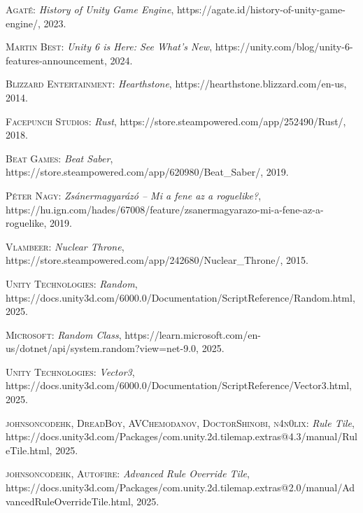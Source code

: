 \documentclass[
]{thesis-ekf}
\theoremstyle{definition}
\theoremstyle{remark}
\begin{document}
\begin{thebibliography}{2}
		\textsc{Agaté}: \emph{History of Unity Game Engine}, https://agate.id/history-of-unity-game-engine/, 2023.
		
		\textsc{Martin Best}: \emph{Unity 6 is Here: See What's New}, https://unity.com/blog/unity-6-features-announcement, 2024.
		
		\textsc{Blizzard Entertainment}: \emph{Hearthstone}, https://hearthstone.blizzard.com/en-us, 2014.
		
		\textsc{Facepunch Studios}: \emph{Rust}, https://store.steampowered.com/app/252490/Rust/, 2018.
		
		\textsc{Beat Games}: \emph{Beat Saber}, https://store.steampowered.com/app/620980/Beat\_Saber/, 2019.
		
		\textsc{Péter Nagy}: \emph{Zsánermagyarázó – Mi a fene az a roguelike?}, https://hu.ign.com/hades/67008/feature/zsanermagyarazo-mi-a-fene-az-a-roguelike, 2019.
		
		\textsc{Vlambeer}: \emph{Nuclear Throne}, https://store.steampowered.com/app/242680/Nuclear\_Throne/, 2015.
		
		\textsc{Unity Technologies}: \emph{Random}, https://docs.unity3d.com/6000.0/Documentation/ScriptReference/Random.html, 2025.
		
		\textsc{Microsoft}: \emph{Random Class}, https://learn.microsoft.com/en-us/dotnet/api/system.random?view=net-9.0, 2025.
		
		\textsc{Unity Technologies}: \emph{Vector3}, https://docs.unity3d.com/6000.0/Documentation/ScriptReference/Vector3.html, 2025.
		
		\textsc{johnsoncodehk, DreadBoy, AVChemodanov, DoctorShinobi, n4n0lix}: \emph{Rule Tile}, https://docs.unity3d.com/Packages/com.unity.2d.tilemap.extras@4.3/manual/RuleTile.html, 2025.
		
		\textsc{johnsoncodehk, Autofire}: \emph{Advanced Rule Override Tile}, https://docs.unity3d.com/Packages/com.unity.2d.tilemap.extras@2.0/manual/AdvancedRuleOverrideTile.html, 2025.
		
		
	\end{thebibliography}
	
\end{document}
